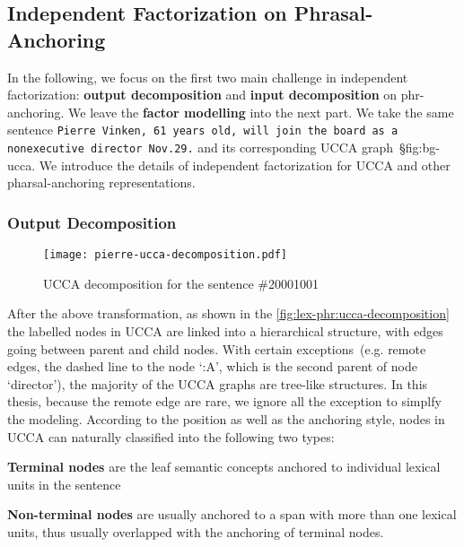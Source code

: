 \subsection{Independent Factorization on Phrasal-Anchoring}
\label{ssec:lex-phr:phr-factorization-analysis}
In the following, we focus on the first two main challenge in
independent factorization: \textbf{output decomposition} and
\textbf{input decomposition} on phr-anchoring. We leave the
\textbf{factor modelling} into the next part. We take the same
sentence \texttt{Pierre Vinken, 61 years old, will join the board as a
  nonexecutive director Nov.29.} and its corresponding UCCA
graph~\S{fig:bg-ucca}. We introduce the details of independent
factorization for UCCA and other pharsal-anchoring representations.

\subsubsection{Output Decomposition}
\label{sssec:lex-phr:phr-output-decomposition}
\begin{figure}[!th]
  \centering
  \texttt{[image: pierre-ucca-decomposition.pdf]}
  \caption{\label{fig:lex-phr:ucca-decomposition} UCCA decomposition
    for the sentence \#20001001}
\end{figure}

After the above transformation, as shown in the
\autoref{fig:lex-phr:ucca-decomposition} the labelled nodes in UCCA
are linked into a hierarchical structure, with edges going between
parent and child nodes. With certain exceptions~(e.g. remote edges,
the dashed line to the node `:A', which is the second parent of node
`director'), the majority of the UCCA graphs are tree-like
structures. In this thesis, because the remote edge are rare, we
ignore all the exception to simplfy the modeling. According to the
position as well as the anchoring style, nodes in UCCA can naturally
classified into the following two types:

\begin{inparaenum}
\item \textbf{Terminal nodes} are the leaf semantic
  concepts anchored to individual lexical units in the sentence

\item \textbf{Non-terminal nodes} are usually anchored to a span with
  more than one lexical units, thus usually overlapped with the
  anchoring of terminal nodes.
\end{inparaenum}

